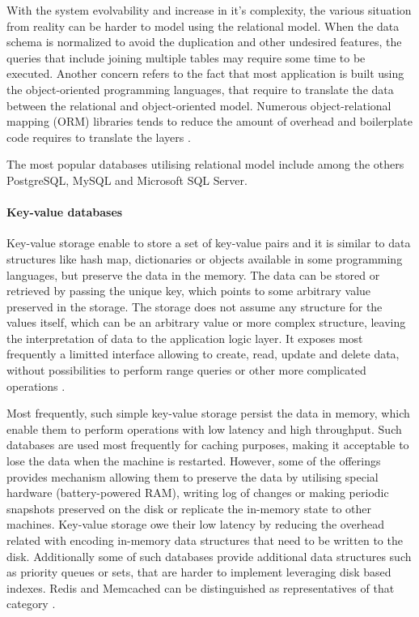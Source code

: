 With the system evolvability and increase in it's complexity, the various situation from reality can be harder to model using the relational model. When the data schema is normalized to avoid the duplication and other undesired features, the queries that include joining multiple tables may require some time to be executed. Another concern refers to the fact that most application is built using the object-oriented programming languages, that require to translate the data between the relational and object-oriented model. Numerous object-relational mapping (ORM) libraries tends to reduce the amount of overhead and boilerplate code requires to translate the layers \cite{DesignDataIntensiveApplications}.

The most popular databases utilising relational model include among the others PostgreSQL, MySQL and Microsoft SQL Server.

\paragraph*{Key-value databases}

Key-value storage enable to store a set of key-value pairs and it is similar to data structures like hash map, dictionaries or objects available in some programming languages, but preserve the data in the memory. The data can be stored or retrieved by passing the unique key, which points to some arbitrary value preserved in the storage.
The storage does not assume any structure for the values itself, which can be an arbitrary value or more complex structure, leaving the interpretation of data to the application logic layer.
It exposes most frequently a limitted interface allowing to create, read, update and delete data, without possibilities to perform range queries or other more complicated operations \cite{NoSQLDatabaseSystemsSurveyDecisionGuidance}.

Most frequently, such simple key-value storage persist the data in memory, which enable them to perform operations with low latency and high throughput. Such databases are used most frequently for caching purposes, making it acceptable to lose the data when the machine is restarted. However, some of the offerings provides mechanism allowing them to preserve the data by utilising special hardware (battery-powered RAM), writing log of changes or making periodic snapshots preserved on the disk or replicate the in-memory state to other machines. Key-value storage owe their low latency by reducing the overhead related with encoding in-memory data structures that need to be written to the disk. Additionally some of such databases provide additional data structures such as priority queues or sets, that are harder to implement leveraging disk based indexes. Redis and Memcached can be distinguished as representatives of that category \cite{DesignDataIntensiveApplications}. 

